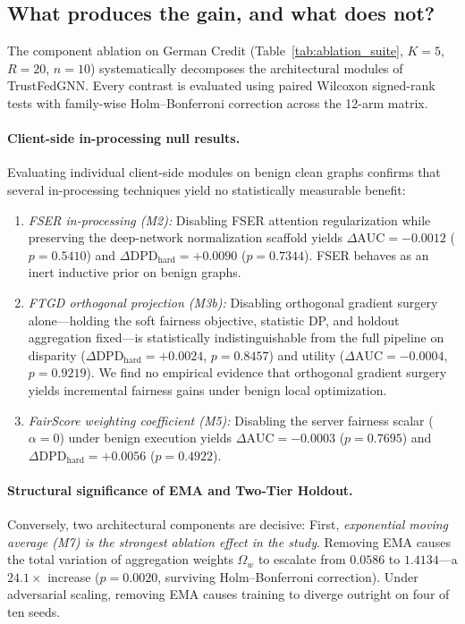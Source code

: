 \documentclass[preprint,12pt]{elsarticle}
\theoremstyle{plain}
\theoremstyle{definition}
\theoremstyle{remark}
\begin{document}
\subsection{What produces the gain, and what does not?}
\label{sec:res_attribution}



The component ablation on German Credit (Table~\ref{tab:ablation_suite}, $K=5$, $R=20$, $n=10$) systematically decomposes the architectural modules of TrustFedGNN. Every contrast is evaluated using paired Wilcoxon signed-rank tests with family-wise Holm--Bonferroni correction across the 12-arm matrix.

\paragraph{Client-side in-processing null results.}
Evaluating individual client-side modules on benign clean graphs confirms that several in-processing techniques yield no statistically measurable benefit:
\begin{enumerate}
\item \emph{FSER in-processing (M2):} Disabling FSER attention regularization while preserving the deep-network normalization scaffold yields $\Delta\mathrm{AUC} = -0.0012$ ($p = 0.5410$) and $\Delta\mathrm{DPD}_{\mathrm{hard}} = +0.0090$ ($p = 0.7344$). FSER behaves as an inert inductive prior on benign graphs.
\item \emph{FTGD orthogonal projection (M3b):} Disabling orthogonal gradient surgery alone---holding the soft fairness objective, statistic DP, and holdout aggregation fixed---is statistically indistinguishable from the full pipeline on disparity ($\Delta\mathrm{DPD}_{\mathrm{hard}} = +0.0024$, $p = 0.8457$) and utility ($\Delta\mathrm{AUC} = -0.0004$, $p = 0.9219$). We find no empirical evidence that orthogonal gradient surgery yields incremental fairness gains under benign local optimization.
\item \emph{FairScore weighting coefficient (M5):} Disabling the server fairness scalar ($\alpha = 0$) under benign execution yields $\Delta\mathrm{AUC} = -0.0003$ ($p = 0.7695$) and $\Delta\mathrm{DPD}_{\mathrm{hard}} = +0.0056$ ($p = 0.4922$).
\end{enumerate}

\paragraph{Structural significance of EMA and Two-Tier Holdout.}
Conversely, two architectural components are decisive:
First, \emph{exponential moving average (M7) is the strongest ablation effect in the study}. Removing EMA causes the total variation of aggregation weights $\Omega_w$ to escalate from $0.0586$ to $1.4134$---a $\mathbf{24.1\times}$ increase ($p = 0.0020$, surviving Holm--Bonferroni correction). Under adversarial scaling, removing EMA causes training to diverge outright on four of ten seeds.
\end{document}
